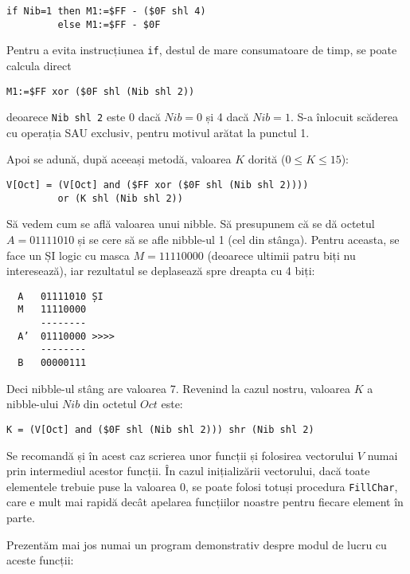 \begin{verbatim}
if Nib=1 then M1:=$FF - ($0F shl 4)
         else M1:=$FF - $0F
\end{verbatim}

Pentru a evita instrucțiunea {\tt if}, destul de mare consumatoare de timp, se
poate calcula direct

\begin{verbatim}
M1:=$FF xor ($0F shl (Nib shl 2))
\end{verbatim}

deoarece {\tt Nib shl 2} este 0 dacă $Nib = 0$ și 4 dacă $Nib = 1$. S-a
înlocuit scăderea cu operația SAU exclusiv, pentru motivul arătat la punctul
1.

Apoi se adună, după aceeași metodă, valoarea $K$ dorită ($0 \leq K \leq 15$):

\begin{verbatim}
V[Oct] = (V[Oct] and ($FF xor ($0F shl (Nib shl 2))))
         or (K shl (Nib shl 2))
\end{verbatim}

Să vedem cum se află valoarea unui nibble. Să presupunem că se dă octetul $A =
01111010$ și se cere să se afle nibble-ul 1 (cel din stânga). Pentru aceasta,
se face un ȘI logic cu masca $M = 11110000$ (deoarece ultimii patru biți nu
interesează), iar rezultatul se deplasează spre dreapta cu 4 biți:

\begin{verbatim}
  A   01111010 ȘI
  M   11110000
      --------
  A’  01110000 >>>>
      --------
  B   00000111
\end{verbatim}

Deci nibble-ul stâng are valoarea 7. Revenind la cazul nostru, valoarea $K$ a
nibble-ului $Nib$ din octetul $Oct$ este:

\begin{verbatim}
K = (V[Oct] and ($0F shl (Nib shl 2))) shr (Nib shl 2)
\end{verbatim}

Se recomandă și în acest caz scrierea unor funcții și folosirea vectorului $V$
numai prin intermediul acestor funcții. În cazul inițializării vectorului,
dacă toate elementele trebuie puse la valoarea 0, se poate folosi totuși
procedura {\tt FillChar}, care e mult mai rapidă decât apelarea funcțiilor
noastre pentru fiecare element în parte.

Prezentăm mai jos numai un program demonstrativ despre modul de lucru cu
aceste funcții:

\inputminted{pascal}{src/chapter3-2.pas}

